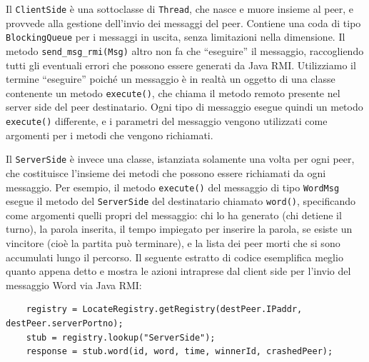\documentclass[9pt]{article}
\begin{document}
Il \texttt{ClientSide} è una sottoclasse di \texttt{Thread}, che nasce e muore insieme al peer, e provvede alla gestione dell'invio dei messaggi del peer. Contiene una coda di tipo \texttt{BlockingQueue} per i messaggi in uscita, senza limitazioni nella dimensione. Il metodo \texttt{send\_msg\_rmi(Msg)} altro non fa che ``eseguire'' il messaggio, raccogliendo tutti gli eventuali errori che possono essere generati da Java RMI. 
Utilizziamo il termine ``eseguire'' poiché un messaggio è in realtà un oggetto di una classe contenente un metodo \texttt{execute()}, che chiama il metodo remoto presente nel server side del peer destinatario. Ogni tipo di messaggio esegue quindi un metodo \texttt{execute()} differente, e i parametri del messaggio vengono utilizzati come argomenti per i metodi che vengono richiamati. 

Il \texttt{ServerSide} è invece una classe, istanziata solamente una volta per ogni peer, che costituisce l'insieme dei metodi che possono essere richiamati da ogni messaggio. Per esempio, il metodo \texttt{execute()} del messaggio di tipo \texttt{WordMsg} esegue il metodo del \texttt{ServerSide} del destinatario chiamato \texttt{word()}, specificando come argomenti quelli propri del messaggio: chi lo ha generato (chi detiene il turno), la parola inserita, il tempo impiegato per inserire la parola, se esiste un vincitore (cioè la partita può terminare), e la lista dei peer morti che si sono accumulati lungo il percorso.
Il seguente estratto di codice esemplifica meglio quanto appena detto e mostra le azioni intraprese dal client side per l'invio del messaggio Word via Java RMI:
\begin{verbatim}
	registry = LocateRegistry.getRegistry(destPeer.IPaddr, destPeer.serverPortno);
	stub = registry.lookup("ServerSide");
	response = stub.word(id, word, time, winnerId, crashedPeer);
\end{verbatim}
\end{document}
